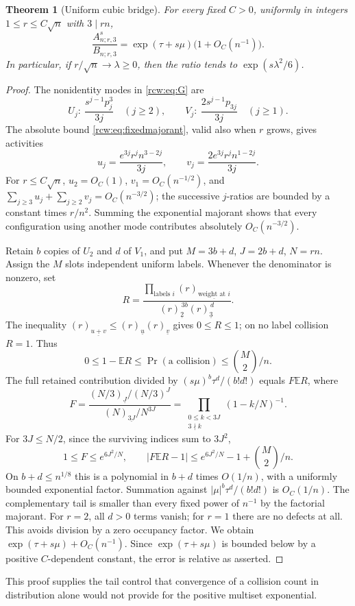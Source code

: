 \documentclass[11pt]{article}
\newtheorem{theorem}{Theorem}[section]
\theoremstyle{definition}\newtheorem{definition}[theorem]{Definition}
\theoremstyle{remark}\newtheorem{remark}[theorem]{Remark}
\newcommand{\fall}[2]{(#1)_{\underline{#2}}}
\numberwithin{equation}{section}
\begin{document}
\begin{theorem}[Uniform cubic bridge]\label{rcw:thm:bridge}
For every fixed $C>0$, uniformly in integers $1\le r\le C\sqrt n$ with $3\mid rn$,
\begin{equation}\label{rcw:eq:bridge}
 \frac{A^s_{n;r,3}}{B_{n;r,3}}
 =\exp(\tau+s\mu)\bigl(1+O_C(n^{-1})\bigr).
\end{equation}
In particular, if $r/\sqrt n\to\lambda\ge0$, then the ratio tends to $\exp(s\lambda^2/6)$.
\end{theorem}
\begin{proof}
The nonidentity modes in \eqref{rcw:eq:G} are
\[
 U_j:\ \frac{s^{j-1}p_j^3}{3j}\quad(j\ge2),\qquad
 V_j:\ \frac{2s^{j-1}p_{3j}}{3j}\quad(j\ge1).
\]
The absolute bound \eqref{rcw:eq:fixedmajorant}, valid also when $r$ grows, gives activities
\[
 u_j=\frac{e^{3j}r^j n^{3-2j}}{3j},\qquad
 v_j=\frac{2e^{3j}r^j n^{1-2j}}{3j}.
\]
For $r\le C\sqrt n$, $u_2=O_C(1)$, $v_1=O_C(n^{-1/2})$, and
$\sum_{j\ge3}u_j+\sum_{j\ge2}v_j=O_C(n^{-3/2})$; the successive $j$-ratios are bounded by a constant times $r/n^2$. Summing the exponential majorant shows that every configuration using another mode contributes absolutely $O_C(n^{-3/2})$.

Retain $b$ copies of $U_2$ and $d$ of $V_1$, and put $M=3b+d$, $J=2b+d$, $N=rn$. Assign the $M$ slots independent uniform labels. Whenever the denominator is nonzero, set
\[
 R=\frac{\prod_{\text{labels }i}\fall r{\text{weight at }i}}
          {\fall r2^{\,3b}\fall r3^{\,d}}.
\]
The inequality $\fall r{u+v}\le\fall ru\fall rv$ gives $0\le R\le1$; on no label collision $R=1$. Thus
\[
 0\le1-\mathbb E R\le\Pr(\text{a collision})\le\binom M2/n.
\]
The full retained contribution divided by $(s\mu)^b\tau^d/(b!d!)$ equals $F\mathbb E R$, where
\[
 F=\frac{\fall{N/3}{J}/(N/3)^J}{\fall N{3J}/N^{3J}}
   =\prod_{\substack{0\le k<3J\\3\nmid k}}(1-k/N)^{-1}.
\]
For $3J\le N/2$, since the surviving indices sum to $3J^2$,
\[
 1\le F\le e^{6J^2/N},\qquad
 |F\mathbb E R-1|\le e^{6J^2/N}-1+\binom M2/n.
\]
On $b+d\le n^{1/8}$ this is a polynomial in $b+d$ times $O(1/n)$, with a uniformly bounded exponential factor. Summation against $|\mu|^b\tau^d/(b!d!)$ is $O_C(1/n)$. The complementary tail is smaller than every fixed power of $n^{-1}$ by the factorial majorant. For $r=2$, all $d>0$ terms vanish; for $r=1$ there are no defects at all. This avoids division by a zero occupancy factor. We obtain $\exp(\tau+s\mu)+O_C(n^{-1})$. Since $\exp(\tau+s\mu)$ is bounded below by a positive $C$-dependent constant, the error is relative as asserted.
\end{proof}
This proof supplies the tail control that convergence of a collision count in distribution alone would not provide for the positive multiset exponential.
\end{document}

